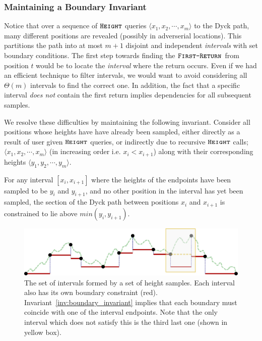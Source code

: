 \subsubsection{Maintaining a Boundary Invariant}
\label{sec:maintaining_a_boundary_invariant}
Notice that over a sequence of $\texttt{\textsc{Height}}$ queries $\langle x_1, x_2,\cdots, x_m \rangle$ to the Dyck path,
many different positions are revealed (possibly in adverserial locations).
This partitions the path into at most $m+1$ disjoint and independent \emph{intervals} with set boundary conditions.
The first step towards finding the $\texttt{\textsc{First-Return}}$ from position $t$ would be to locate the \emph{interval} where the return occurs.
Even if we had an efficient technique to filter intervals, we would want to avoid considering all $\Theta(m)$ intervals to find the correct one.
In addition, the fact that a specific interval \emph{does not} contain the first return implies dependencies for all subsequent samples.

We resolve these difficulties by maintaining the following invariant.
Consider all positions whose heights have have already been sampled, either directly as a result of user given $\texttt{\textsc{Height}}$ queries,
or indirectly due to recursive $\texttt{\textsc{Height}}$ calls; $\langle x_1, x_2,\cdots, x_m \rangle$ (in increasing order i.e. $x_i<x_{i+1}$)
along with their corresponding heights $ \langle y_1, y_2,\cdots, y_m \rangle$.
\begin{invariant}
\label{inv:boundary_invariant}
For any interval $[x_i,x_{i+1}]$ where the heights  of the endpoints have been sampled to be $y_i$ and $y_{i+1}$,
and no other position in the interval has yet been sampled,
the section of the Dyck path between positions $x_i$ and $x_{i+1}$ is constrained to lie above $min(y_i, y_{i+1})$.
\end{invariant}
\begin{figure}[htpb]
    \centering
    \includegraphics[width=\textwidth]{images/dyck_boundary_invariant.pdf}
    \caption{The set of intervals formed by a set of height samples.
        Each interval also has its own boundary constraint (red).
        Invariant~\ref{inv:boundary_invariant} implies that each boundary must coincide with one of the interval endpoints.
        Note that the only interval which does not satisfy this is the third last one (shown in yellow box).}
    \label{fig:dyck_boundary_invariant}
\end{figure}

